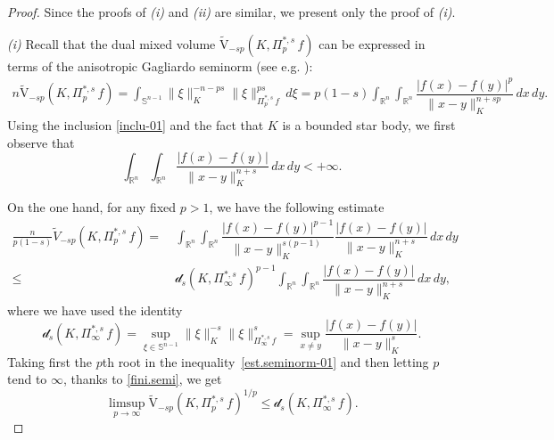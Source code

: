 \documentclass[11pt, reqno]{article}
\theoremstyle{definition}
\numberwithin{equation}{section}
\newcommand{\R}{\mathbb{R}}
\newcommand{\Sphere}{\mathbb{S}^{n - 1}}
\newcommand{\vtil}{\widetilde{\mathrm{V}}}
\newcommand{\dila}{\mathscr{d}}
\begin{document}
\begin{proof}
Since the proofs of \textit{(i)} and \textit{(ii)} are similar, we present only the proof of \textit{(i)}.

\medskip

\textit{(i)}
Recall that the dual mixed volume $\vtil_{-sp}(K, \Pi^{\ast, s}_p \, f)$ can be expressed in terms of the anisotropic Gagliardo seminorm (see e.g. \cite[Page 1098]{HL_2024}):
	\begin{align*}
		n \vtil_{-sp}(K, \Pi^{\ast, s}_p \, f) = 
		\int_{\Sphere} \| \xi \|_K^{- n - ps} \| \xi \|_{\Pi^{\ast, s}_p \, f}^{ps} \, d\xi =  p(1 - s) \int_{\R^n} \int_{\R^n} \dfrac{|f(x) - f(y)|^p}{\| x - y \|_K^{n + sp}} \,dx \,dy.
	\end{align*}
Using the inclusion \eqref{inclu-01} and the fact that $K$ is a bounded star body, we first observe that
	\begin{equation}\label{fini.semi}
		\int_{\R^n} \int_{\R^n} \dfrac{|f(x) - f(y)|}{\| x - y \|_K^{n + s}} \, dx \, dy < + \infty.
	\end{equation}

\smallskip

On the one hand, for any fixed $p > 1$, we have the following estimate 
\begin{equation}\label{est.seminorm-01}
	\begin{split}
    \frac{n}{p (1 - s)} \widetilde V_{-sp}(K, \Pi^{\ast, s}_p \, f) = & ~ 
     \int_{\R^n} \int_{\R^n} \dfrac{|f(x) - f(y)|^{p - 1}}{\| x - y \|^{s(p - 1)}_K} \dfrac{|f(x) - f(y)|}{\| x - y \|^{n + s}_K} \, dx\,dy
     \\
    \leq & ~ 
   \dila_s(K, \Pi^{\ast, s}_\infty \, f)^{p - 1} \int_{\R^n} \int_{\R^n}  \dfrac{|f(x) - f(y)|}{\| x - y \|_K^{n + s}} \, dx \, dy,
   \end{split}
\end{equation}
where we have used the identity
\begin{equation}\label{dila-holder}
	\dila_s(K, \Pi^{\ast, s}_\infty \, f) = \sup_{\xi \in \Sphere} \| \xi \|^{-s}_K \| \xi \|_{\Pi^{\ast, s}_\infty \, f}^s = \sup_{x \neq y} \dfrac{|f(x) - f(y)|}{\| x - y \|_K^s}.
\end{equation}
Taking  first the $p$th root in the inequality~\eqref{est.seminorm-01} and then letting $p$ tend to $\infty$, thanks to \eqref{fini.semi}, we get
    \begin{equation}\label{est.vtil-dila-01}
        \limsup_{p \to \infty} \vtil_{-sp}(K, \Pi^{\ast, s}_p \, f)^{1/p} \leq \dila_s(K, \Pi^{\ast, s}_\infty \, f).
    \end{equation}
    

\end{proof}
\end{document}
